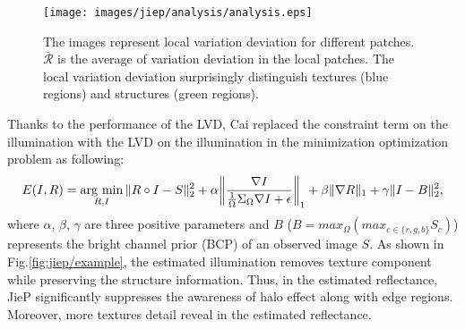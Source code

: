 \begin{figure}[t]
	\centering
	\texttt{[image: images/jiep/analysis/analysis.eps]}
	\caption{The images represent local variation deviation for different patches. $\bar{\mathcal{R}}$ is the average of variation deviation in the local patches. The local variation deviation surprisingly distinguish textures (blue regions) and structures (green regions).
	} \label{fig:jiep/analysis}
\end{figure}

Thanks to the performance of the LVD, Cai replaced the constraint term on the illumination with the LVD on the illumination in the minimization optimization problem as following:
\begin{equation}
 E(I, R) = \mathop{\rm arg~min}\limits_{R, I} \|R \circ I - S\|_{2}^{2} + \alpha{\left \|\frac{\nabla{I}}{\frac{1}{\Omega}\Sigma_{\Omega}\nabla{I} + \epsilon} \right\|_{1}} + \beta{\|\nabla{R}\|_{1}} + \gamma{\|I - B\|_{2}^{2}}, \label{eq:jiep}
\end{equation}
where $\alpha$, $\beta$, $\gamma$ are three positive parameters and $B$ ($B = max_{\Omega}(max_{c \in \{r, g, b\}}S_{c})$) represents the bright channel prior (BCP) of an observed image $S$. As shown in Fig.\ref{fig:jiep/example}, the estimated illumination removes texture component while preserving the structure information. Thus, in the estimated reflectance, JieP significantly suppresses the awareness of halo effect along with edge regions. Moreover, more textures detail reveal in the estimated reflectance.

